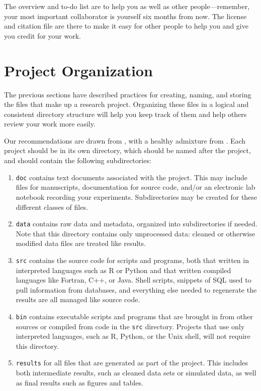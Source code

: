 \documentclass[10pt]{article}
\begin{document}
The overview and to-do list are to help you as well as other
people---remember, your most important collaborator is yourself six
months from now. The license and citation file are there to make it easy
for other people to help you and give you credit for your work.

\section{Project Organization}\label{project-organization}

The previous sections have described practices for creating, naming,
and storing the files that make up a research project.  Organizing
these files in a logical and consistent directory structure will help
you keep track of them and help others review your work more easily.

Our recommendations are drawn from \cite{noble2009}, with a healthy
admixture from \cite{gentzkow2014}. Each project should be in its own
directory, which should be named after the project, and should contain
the following subdirectories:

\begin{enumerate}
\item
  \texttt{doc} contains text documents associated with the project. This
  may include files for manuscripts, documentation for source code,
  and/or an electronic lab notebook recording your experiments.
  Subdirectories may be created for these different classes of files.
\item
  \texttt{data} contains raw data and metadata, organized into
  subdirectories if needed. Note that this directory contains only
  unprocessed data: cleaned or otherwise modified data files are treated
  like results.
\item
  \texttt{src} contains the source code for scripts and programs, both
  that written in interpreted languages such as R or Python and that
  written compiled languages like Fortran, C++, or Java. Shell scripts,
  snippets of SQL used to pull information from databases, and
  everything else needed to regenerate the results are all managed like
  source code.
\item
  \texttt{bin} contains executable scripts and programs that are brought
  in from other sources or compiled from code in the \texttt{src}
  directory. Projects that use only interpreted languages, such as R,
  Python, or the Unix shell, will not require this directory.
\item
  \texttt{results} for all files that are generated as part of the
  project. This includes both intermediate results, such as cleaned data
  sets or simulated data, as well as final results such as figures and
  tables.
\end{enumerate}
\end{document}
